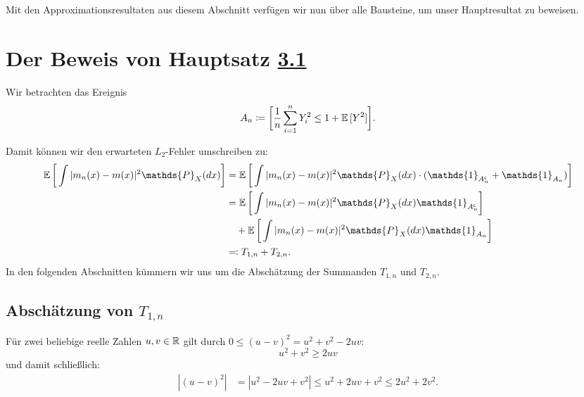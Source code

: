 {Mit den Approximationsresultaten aus diesem Abschnitt verfügen wir nun über alle Bausteine, um unser Hauptresultat zu beweisen.

\section{Der Beweis von Hauptsatz \hyperref[optstop]{3.1}}

Wir betrachten das Ereignis 
\begin{equation}
\label{event}
A_n \coloneqq \bigg[\frac{1}{n} \sum_{i = 1}^n Y_i^2 \leq 1 + \mathbb{E}\,[Y^2]\bigg].
\end{equation}

Damit können wir den erwarteten $L_2$-Fehler umschreiben zu:
\begin{equation}
\label{originaleq}
\begin{split}
\E \bigg[\int |m_n(x) - m(x)|^2 \mathds{P}_X(dx)\bigg] & = \E \bigg[\int |m_n(x) - m(x)|^2 \mathds{P}_X(dx) \cdot (\mathds{1}_{A_n^{\mathsf{c}}} + \mathds{1}_{A_n})\bigg] \\
& = \E \bigg[\int |m_n(x) - m(x)|^2 \mathds{P}_X(dx) \mathds{1}_{A_n^{\mathsf{c}}}\bigg] \\
& \quad + \E \bigg[\int |m_n(x) - m(x)|^2 \mathds{P}_X(dx) \mathds{1}_{A_n}\bigg] \\
& \eqqcolon T_{1,n} + T_{2,n}.
\end{split}
\end{equation}
In den folgenden Abschnitten kümmern wir uns um die Abschätzung der Summanden $T_{1,n}$ und $T_{2,n}$.

\subsection{Abschätzung von $T_{1,n}$}

Für zwei beliebige reelle Zahlen $u, v \in \mathbb{R}$ gilt durch $0 \leq (u - v)^2 = u^2 + v^2 - 2uv$:
$$u^2 + v^2 \geq 2uv$$ und damit schließlich:
\begin{equation}
\label{ungl}
\begin{split}
|(u - v)^2| & = |u^2 - 2uv + v^2|
\leq  u^2 + 2uv + v^2
\leq 2u^2 + 2v^2.
\end{split}
\end{equation}

}
